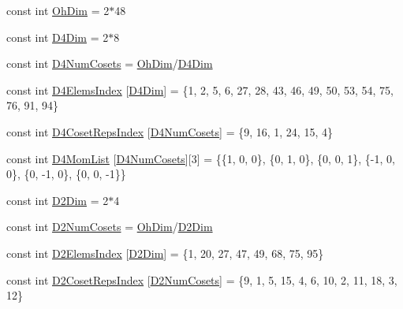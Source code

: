 \begin{DoxyCompactItemize}
\item 
const int \mbox{\hyperlink{namespaceHadron_a2bea98b7ecd13619ef78b6d204d59707}{Oh\+Dim}} = 2$\ast$48
\item 
const int \mbox{\hyperlink{namespaceHadron_a7cc48609a6458d05394bf6349cfbf4ca}{D4\+Dim}} = 2$\ast$8
\item 
const int \mbox{\hyperlink{namespaceHadron_a7271d98ab4cd4b0564cf4eacf6702230}{D4\+Num\+Cosets}} = \mbox{\hyperlink{namespaceHadron_a2bea98b7ecd13619ef78b6d204d59707}{Oh\+Dim}}/\mbox{\hyperlink{namespaceHadron_a7cc48609a6458d05394bf6349cfbf4ca}{D4\+Dim}}
\item 
const int \mbox{\hyperlink{namespaceHadron_afd73b89ce6fc83184a91cff050931ff4}{D4\+Elems\+Index}} \mbox{[}\mbox{\hyperlink{namespaceHadron_a7cc48609a6458d05394bf6349cfbf4ca}{D4\+Dim}}\mbox{]} = \{1, 2, 5, 6, 27, 28, 43, 46, 49, 50, 53, 54, 75, 76, 91, 94\}
\item 
const int \mbox{\hyperlink{namespaceHadron_a9af222d257dfd087f91192daf5876c6c}{D4\+Coset\+Reps\+Index}} \mbox{[}\mbox{\hyperlink{namespaceHadron_a7271d98ab4cd4b0564cf4eacf6702230}{D4\+Num\+Cosets}}\mbox{]} = \{9, 16, 1, 24, 15, 4\}
\item 
const int \mbox{\hyperlink{namespaceHadron_aa5f7990f1895fa2ed975c2a6cbfbc284}{D4\+Mom\+List}} \mbox{[}\mbox{\hyperlink{namespaceHadron_a7271d98ab4cd4b0564cf4eacf6702230}{D4\+Num\+Cosets}}\mbox{]}\mbox{[}3\mbox{]} = \{\{1, 0, 0\}, \{0, 1, 0\}, \{0, 0, 1\}, \{-\/1, 0, 0\}, \{0, -\/1, 0\}, \{0, 0, -\/1\}\}
\item 
const int \mbox{\hyperlink{namespaceHadron_af071977674047009b141391b4256dc12}{D2\+Dim}} = 2$\ast$4
\item 
const int \mbox{\hyperlink{namespaceHadron_a4e182e6efe3c7594360137b45836d532}{D2\+Num\+Cosets}} = \mbox{\hyperlink{namespaceHadron_a2bea98b7ecd13619ef78b6d204d59707}{Oh\+Dim}}/\mbox{\hyperlink{namespaceHadron_af071977674047009b141391b4256dc12}{D2\+Dim}}
\item 
const int \mbox{\hyperlink{namespaceHadron_ad481c51b99eb36018e012864825a09fb}{D2\+Elems\+Index}} \mbox{[}\mbox{\hyperlink{namespaceHadron_af071977674047009b141391b4256dc12}{D2\+Dim}}\mbox{]} = \{1, 20, 27, 47, 49, 68, 75, 95\}
\item 
const int \mbox{\hyperlink{namespaceHadron_a3158fcd763d5c6e042be73a11c683843}{D2\+Coset\+Reps\+Index}} \mbox{[}\mbox{\hyperlink{namespaceHadron_a4e182e6efe3c7594360137b45836d532}{D2\+Num\+Cosets}}\mbox{]} = \{9, 1, 5, 15, 4, 6, 10, 2, 11, 18, 3, 12\}

\end{DoxyCompactItemize}
